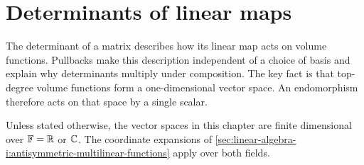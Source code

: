 \chapter{Determinants of linear maps}
\label{ch:linear-algebra-i:determinants-of-linear-maps}

The determinant of a matrix describes how its linear map acts on volume
functions. Pullbacks make this description independent of a choice of basis
and explain why determinants multiply under composition. The key fact is
that top-degree volume functions form a one-dimensional vector space.
An endomorphism therefore acts on that space by a single scalar.

Unless stated otherwise, the vector spaces in this chapter are finite
dimensional over \(\mathbb F=\mathbb{R}\) or \(\mathbb{C}\). The coordinate expansions
of \autoref{sec:linear-algebra-i:antisymmetric-multilinear-functions}
apply over both fields.






